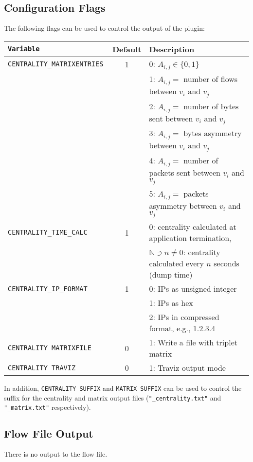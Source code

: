 \documentclass[documentation]{subfiles}
\begin{document}
\subsection{Configuration Flags}
The following flags can be used to control the output of the plugin:
\begin{center}
    \begin{tabular}{>{\tt}lcl}
        \toprule
        {\bf Variable} & {\bf Default} & {\bf Description}\\
        \midrule
        CENTRALITY\_MATRIXENTRIES & 1 & 0: $A_{i,j}\in\{0,1\}$\\
                                  &   & 1: $A_{i,j}=$ number of flows between $v_i$ and $v_j$\\
                                  &   & 2: $A_{i,j}=$ number of bytes sent between $v_i$ and $v_j$\\
                                  &   & 3: $A_{i,j}=$ bytes asymmetry between $v_i$ and $v_j$\\
                                  &   & 4: $A_{i,j}=$ number of packets sent between $v_i$ and $v_j$\\
                                  &   & 5: $A_{i,j}=$ packets asymmetry between $v_i$ and $v_j$\\
        CENTRALITY\_TIME\_CALC    & 1 & 0: centrality calculated at application termination,\\
                                  &   & $\mathbb{N} \ni n\neq0$: centrality calculated every $n$ seconds (dump time)\\
        CENTRALITY\_IP\_FORMAT    & 1 & 0: IPs as unsigned integer\\
                                  &   & 1: IPs as hex\\
                                  &   & 2: IPs in compressed format, e.g., 1.2.3.4\\
        CENTRALITY\_MATRIXFILE    & 0 & 1: Write a file with triplet matrix\\
        CENTRALITY\_TRAVIZ        & 0 & 1: Traviz output mode\\
        \bottomrule
    \end{tabular}
\end{center}

In addition, {\tt CENTRALITY\_SUFFIX} and {\tt MATRIX\_SUFFIX} can be used to control the suffix for the centrality and matrix output files ({\tt "\_centrality.txt"} and {\tt "\_matrix.txt"} respectively).

\subsection{Flow File Output}
There is no output to the flow file.
\end{document}
